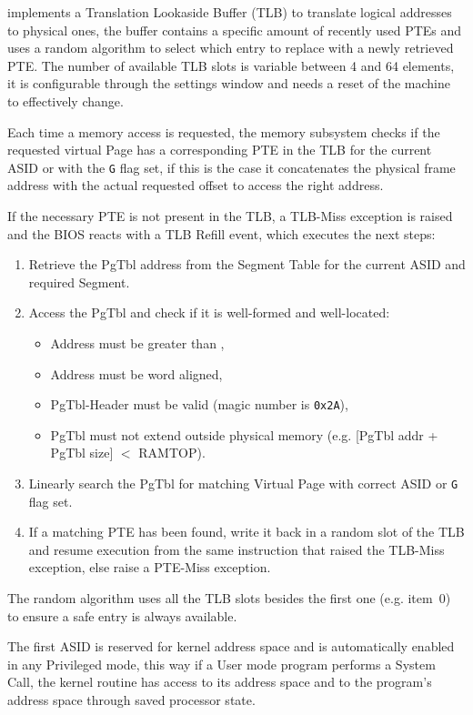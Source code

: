 
\uarm{} implements a Translation Lookaside Buffer (TLB) to translate logical addresses to physical ones, the buffer contains a specific amount of recently used PTEs and uses a random algorithm to select which entry to replace with a newly retrieved PTE.
The number of available TLB slots is variable between 4 and 64 elements, it is configurable through the settings window and needs a reset of the machine to effectively change.

Each time a memory access is requested, the memory subsystem checks if the requested virtual Page has a corresponding PTE in the TLB for the current ASID or with the \texttt{G} flag set, if this is the case it concatenates the physical frame address with the actual requested offset to access the right address.

If the necessary PTE is not present in the TLB, a TLB-Miss exception is raised and the BIOS reacts with a TLB Refill event, which executes the next steps:
\begin{enumerate}
\item Retrieve the PgTbl address from the Segment Table for the current ASID and required Segment.
\item Access the PgTbl and check if it is well-formed and well-located:
	\begin{itemize}
	\item Address must be greater than ,
	\item Address must be word aligned,
	\item PgTbl-Header must be valid (magic number is \texttt{0x2A}),
	\item PgTbl must not extend outside physical memory (e.g. [PgTbl addr + PgTbl size] $<$ RAMTOP).
	\end{itemize}
\item Linearly search the PgTbl for matching Virtual Page with correct ASID or \texttt{G} flag set.
\item If a matching PTE has been found, write it back in a random slot of the TLB and resume execution from the same instruction that raised the TLB-Miss exception, else raise a PTE-Miss exception.
\end{enumerate}

The random algorithm uses all the TLB slots besides the first one (e.g. item~0) to ensure a safe entry is always available.

The first ASID is reserved for kernel address space and is automatically enabled in any Privileged mode, this way if a User mode program performs a System Call, the kernel routine has access to its address space and to the program's address space through saved processor state.


